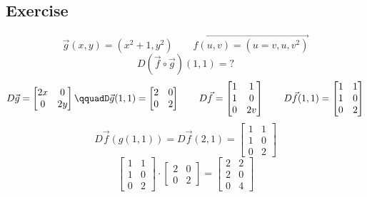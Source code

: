 \documentclass{article}
\begin{document}
\subsection*{Exercise}
\[\vec{g}(x,y)=(x^2+1,y^2)\qquad\vec{f(u,v)=(u=v,u,v^2)}\]
\[D(\vec{f}\circ \vec{g})(1,1)=?\]
\[D\vec{g}=\begin{bmatrix}
    2x&0\\
    0&2y
\end{bmatrix}\qquadD\vec{g}(1,1)=\begin{bmatrix}
    2&0\\
    0&2
\end{bmatrix}\qquad D\vec{f}= \begin{bmatrix}
    1&1\\
    1&0\\
    0&2v
\end{bmatrix}\qquad D\vec{f}(1,1)=\begin{bmatrix}
    1&1\\
    1&0\\
    0&2
\end{bmatrix}\]
\[D\vec{f}(g(1,1))=D\vec{f}(2,1)=\begin{bmatrix}
    1&1\\1&0\\0&2
\end{bmatrix}\]
\[\begin{bmatrix}
    1&1\\1&0\\0&2
\end{bmatrix}\cdot\begin{bmatrix}
    2&0\\0&2
\end{bmatrix}=\begin{bmatrix}
    2&2\\
    2&0\\
    0&4
\end{bmatrix}\]
\end{document}
